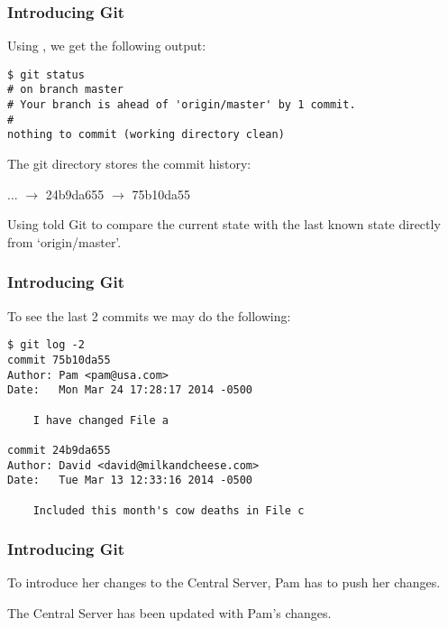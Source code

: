 \begin{frame}[c,fragile]\frametitle{Introducing Git}
    Using , we get the
    following output:

    \newbox{\mybox}
    \begin{lrbox}{\mybox}
    \begin{minipage}{\linewidth}
    \begin{lstlisting}[basicstyle=\footnotesize\ttfamily\color{white}]
$ git status
# on branch master 
# Your branch is ahead of 'origin/master' by 1 commit. 
# 
nothing to commit (working directory clean)  
    \end{lstlisting}
    \end{minipage}
    \end{lrbox}
    \colorbox{black}{\usebox{\mybox}}

    \vspace{0.5cm}
    The git directory stores the commit history:

    \vspace{0.5cm}
    ... $\rightarrow$ \colorbox{black!30}{24b9da655} $\rightarrow$ \colorbox{black!30}{75b10da55}

    \vspace{0.5cm}
    Using  told Git to compare the current state
    with the last known state directly from `origin/master'.
\end{frame}

\begin{frame}[t,fragile]\frametitle{Introducing Git}
    To see the last 2 commits we may do the following:

    \newbox{\abox}
    \begin{lrbox}{\abox}
    \begin{minipage}{\linewidth}
    \begin{lstlisting}[basicstyle=\footnotesize\ttfamily\color{white}]
$ git log -2
commit 75b10da55
Author: Pam <pam@usa.com>
Date:   Mon Mar 24 17:28:17 2014 -0500

    I have changed File a

commit 24b9da655
Author: David <david@milkandcheese.com>
Date:   Tue Mar 13 12:33:16 2014 -0500

    Included this month's cow deaths in File c
    \end{lstlisting}
    \end{minipage}
    \end{lrbox}
    \colorbox{black}{\usebox{\abox}}
\end{frame}

\begin{frame}[t]\frametitle{Introducing Git}
    To introduce her changes to the Central Server, Pam
    has to push her changes.

    \vspace{0.5cm}

    \vspace{0.5cm}
    The Central Server has been updated with Pam's changes.


\end{frame}